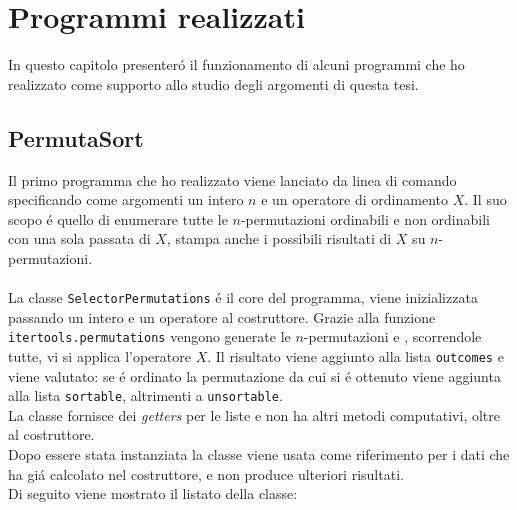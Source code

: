 \chapter{Programmi realizzati}
In questo capitolo presenter\'o il funzionamento di alcuni programmi che ho realizzato come supporto allo studio degli argomenti di questa tesi. 
\section*{PermutaSort}
Il primo programma che ho realizzato viene lanciato da linea di comando specificando come argomenti un intero $n$ e un operatore di ordinamento $X$. Il suo scopo \'e quello di enumerare tutte le $n$-permutazioni ordinabili e non ordinabili con una sola passata di $X$, stampa anche i possibili risultati di $X$ su $n$-permutazioni.\\\\
La classe \texttt{SelectorPermutations} \'e il core del programma, viene inizializzata passando un intero e un operatore al costruttore. Grazie alla funzione \texttt{itertools.permutations} vengono generate le $n$-permutazioni e , scorrendole tutte, vi si applica l'operatore $X$. Il risultato viene aggiunto alla lista \texttt{outcomes} e viene valutato: se \'e ordinato la permutazione da cui si \'e ottenuto viene aggiunta alla lista \texttt{sortable}, altrimenti a \texttt{unsortable}.\\La classe fornisce dei \textit{getters} per le liste e non ha altri metodi computativi, oltre al costruttore.\\
Dopo essere stata instanziata la classe viene usata come riferimento per i dati che ha gi\'a calcolato nel costruttore, e non produce ulteriori risultati.\\Di seguito viene mostrato il listato della classe:
\\
